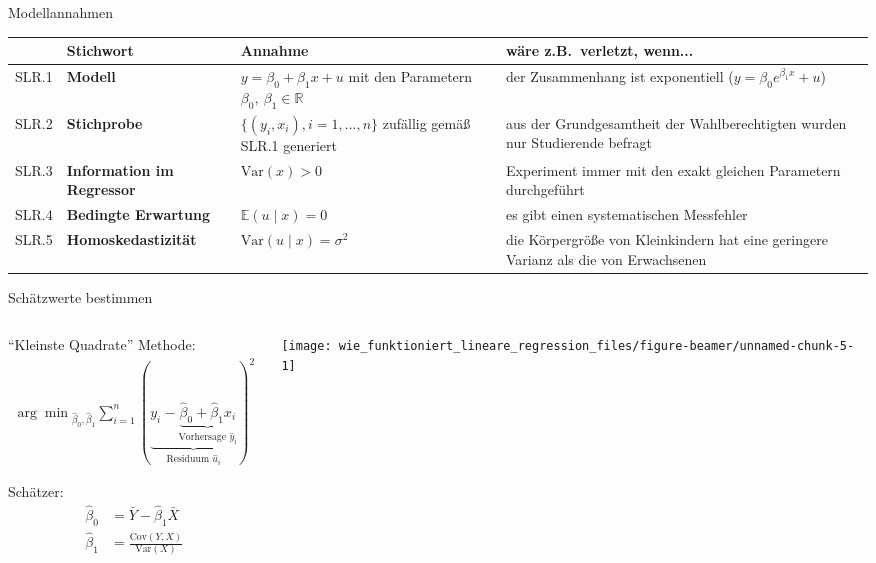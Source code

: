 \documentclass[
  ignorenonframetext,
  t,
  aspectratio=169]{beamer}
\begin{document}
\begin{frame}{Modellannahmen}
\protect\hypertarget{modellannahmen}{}
\vspace{-0.5cm}
\small
\begin{center}
\renewcommand{\arraystretch}{1.5}
\begin{tabular}{lp{2cm}p{4cm}p{5cm}}
       & Stichwort                         & Annahme & wäre z.B.\ verletzt, wenn... \\ \hline
 SLR.1 & \textbf{Modell}                   & $y = \beta_0 + \beta_1 x + u$ mit den Parametern $\beta_0,\ \beta_1 \in \mathbb{R}$ & der Zusammenhang ist exponentiell ($y = \beta_0 e^{\beta_1 x} + u$)\\
 SLR.2 & \textbf{Stichprobe}               & $\{(y_i , x_i ), i = 1, \dots, n\}$ zufällig gemäß SLR.1 generiert & aus der Grundgesamtheit der Wahlberechtigten wurden nur Studierende befragt\\
 SLR.3 & \textbf{Information im Regressor} & $\text{Var}(x) > 0$ & Experiment immer mit den exakt gleichen Parametern durchgeführt \\
 SLR.4 & \textbf{Bedingte Erwartung}       & $\mathbb{E}(u\mid x) = 0$ & es gibt einen systematischen Messfehler \\
 SLR.5 & \textbf{Homoskedastizität}        & $\text{Var}(u\mid x)=\sigma^2$ & die Körpergröße von Kleinkindern hat eine geringere Varianz als die von Erwachsenen\\
\end{tabular}
\end{center}
\normalsize
\end{frame}

\begin{frame}{Schätzwerte bestimmen}
\protect\hypertarget{schuxe4tzwerte-bestimmen}{}
\begin{columns}[T]
\begin{column}{0.48\textwidth}
``Kleinste Quadrate'' Methode: \begin{align*}
  {\arg \min}_{\hat\beta_0, \hat\beta_1} \sum_{i = 1}^n (\underbrace{y_i - \underbrace{\hat\beta_0 + \hat\beta_1 x_i}_{\text{Vorhersage } \hat y_i}}_{\text{Residuum } \hat u_i})^2
\end{align*}

Schätzer: \begin{align*}
  \hat\beta_0 &= \bar{Y} - \hat\beta_1 \bar{X} \\
  \hat\beta_1 &= \frac{\text{Cov}(Y,X)}{\text{Var}(X)}
\end{align*}
\end{column}

\begin{column}{0.48\textwidth}
\texttt{[image: wie\_funktioniert\_lineare\_regression\_files/figure-beamer/unnamed-chunk-5-1]}
\end{column}
\end{columns}
\end{frame}
\end{document}
